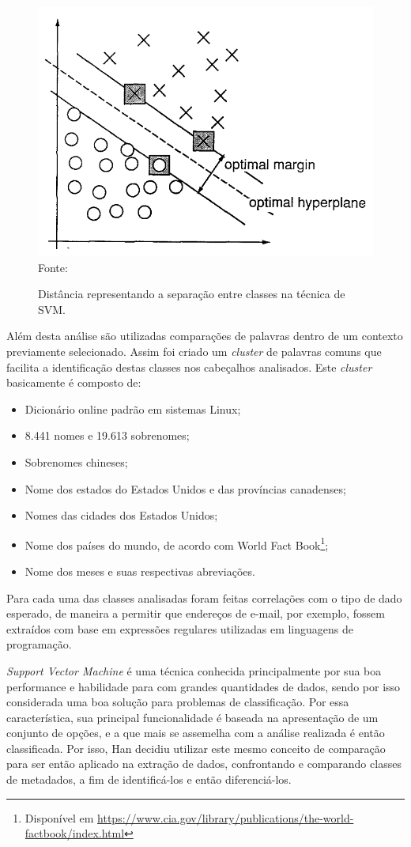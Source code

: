 \begin{figure}
    \centering
    \caption{Distância representando a separação entre classes na técnica de SVM.}
    \includegraphics[width=0.6\linewidth]{./assets/images/svm-graph}
    \center\footnotesize{Fonte: \cite{Vapnik-SVM}}
    \label{fig:svm-graph}
\end{figure}

Além desta análise são utilizadas comparações de palavras dentro de um contexto previamente selecionado. Assim foi criado um \textit{cluster} de palavras comuns que facilita a identificação destas classes nos cabeçalhos analisados. Este \textit{cluster} basicamente é composto de:

\begin{itemize}
    \item Dicionário online padrão em sistemas Linux;
    \item 8.441 nomes e 19.613 sobrenomes;
    \item Sobrenomes chineses;
    \item Nome dos estados do Estados Unidos e das províncias canadenses;
    \item Nomes das cidades dos Estados Unidos;
    \item Nome dos países do mundo, de acordo com World Fact Book\footnote{Disponível em \url{https://www.cia.gov/library/publications/the-world-factbook/index.html}};
    \item Nome dos meses e suas respectivas abreviações.
\end{itemize}

Para cada uma das classes analisadas foram feitas correlações com o tipo de dado esperado, de maneira a permitir que endereços de e-mail, por exemplo, fossem extraídos com base em expressões regulares utilizadas em linguagens de programação.

\emph{Support Vector Machine} é uma técnica conhecida principalmente por sua boa performance e habilidade para com grandes quantidades de dados, sendo por isso considerada uma boa solução para problemas de classificação. Por essa característica, sua principal funcionalidade é baseada na apresentação de um conjunto de opções, e a que mais se assemelha com a análise realizada é então classificada. Por isso, Han \cite{Han-SVM} decidiu utilizar este mesmo conceito de comparação para ser então aplicado na extração de dados, confrontando e comparando classes de metadados, a fim de identificá-los e então diferenciá-los.

